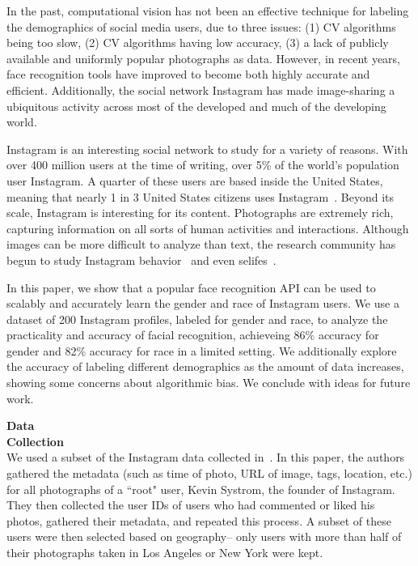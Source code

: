 In the past, computational vision has not been an effective technique for labeling the demographics of social media users, due to three issues: (1) CV algorithms being too slow, (2) CV algorithms having low accuracy, (3) a lack of publicly available and uniformly popular photographs as data.
However, in recent years, face recognition tools have improved to become both highly accurate and efficient.
Additionally, the social network Instagram has made image-sharing a ubiquitous activity across most of the developed and much of the developing world.

Instagram is an interesting social network to study for a variety of reasons.
With over 400 million users at the time of writing, over 5\% of the world's population user Instagram.
A quarter of these users are based inside the United States, meaning that nearly 1 in 3 United States citizens uses Instagram~\cite{igstats}.
Beyond its scale, Instagram is interesting for its content.
Photographs are extremely rich, capturing information on all sorts of human activities and interactions.
Although images can be more difficult to analyze than text, the research community has begun to study Instagram behavior~\cite{hu2014we, bakhshi2014faces} and even selifes~\cite{souza2015dawn}.

In this paper, we show that a popular face recognition API can be used to scalably and accurately learn the gender and race of Instagram users.
We use a dataset of 200 Instagram profiles, labeled for gender and race, to analyze the practicality and accuracy of facial recognition, achieveing 86\% accuracy for gender and 82\% accuracy for race in a limited setting.
We additionally explore the accuracy of labeling different demographics as the amount of data increases, showing some concerns about algorithmic bias.
We conclude with ideas for future work.

\textbf{Data} \\
\textbf{Collection} \\
We used a subset of the Instagram data collected in~\cite{riederer2015cosn}.
In this paper, the authors gathered the metadata (such as time of photo, URL of image, tags, location, etc.) for all photographs of a ``root" user, Kevin Systrom, the founder of Instagram.
They then collected the user IDs of users who had commented or liked his photos, gathered their metadata, and repeated this process.
A subset of these users were then selected based on geography-- only users with more than half of their photographs taken in Los Angeles or New York were kept.

